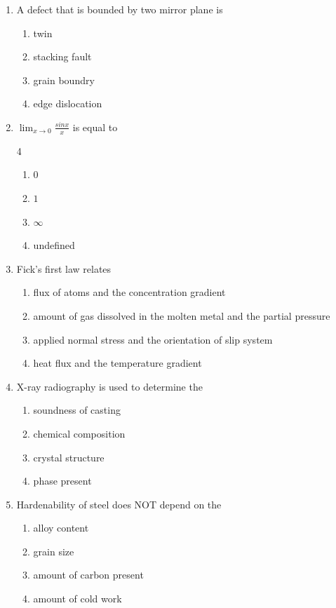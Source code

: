 \documentclass[journal]{IEEEtran}
\theoremstyle{remark}
\begin{document}
\begin{enumerate}
\item A defect that is bounded by two mirror plane is
\hfill{}
\begin{multicols}{4}
\begin{enumerate}
\item twin
\item stacking fault
\item grain boundry
\item edge dislocation
\end{enumerate}
\end{multicols}

\item  $\lim_{x \to 0} \frac{sinx}{x}$ is equal to\hfill{}

\begin {multicols}{4}
\begin{enumerate}
\item $0$
\item $1$
\item $\infty$
\item undefined
\end{enumerate}
\end{multicols}

\item  Fick's first law relates
\hfill{}
\begin{enumerate}
\item flux of atoms and the concentration gradient
\item amount of gas dissolved in the molten metal and the partial pressure
\item applied normal stress and the orientation of slip system
\item heat flux and the temperature gradient
\end{enumerate}

\item  X-ray radiography is used to determine the \hfill{}
\begin{multicols}{2}
\begin{enumerate}
\item soundness of casting
\item chemical composition
\item crystal structure
\item phase present
\end{enumerate}
\end{multicols}

\item Hardenability of steel does NOT depend on the\hfill{}
\begin{multicols}{2}
\begin{enumerate}
\item alloy content
\item grain size
\item amount of carbon present
\item amount of cold work
\end{enumerate}
\end{multicols}


\end{enumerate}
\end{document}
